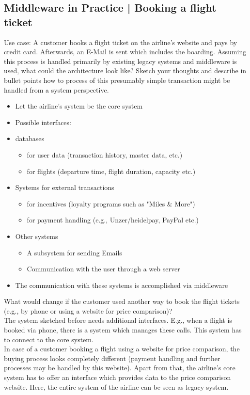 \documentclass{article}
\begin{document}
\subsection{Middleware in Practice | Booking a flight ticket}
Use case: A customer books a flight ticket on the airline's website and pays by credit card. Afterwards, an E-Mail is sent which includes the boarding. Assuming this process is handled primarily by existing legacy systems and middleware is used, what could the architecture look like? Sketch your thoughts and describe in bullet points how to process of this presumably simple transaction might be handled from a system perspective.
\begin{itemize}
    \item Let the airline's system be the core system
    \item Possible interfaces:
    \item databases
          \begin{itemize}
              \item for user data (transaction history, master data, etc.)
              \item for flights (departure time, flight duration, capacity etc.)
          \end{itemize}
    \item Systems for external transactions
          \begin{itemize}
              \item for incentives (loyalty programs such as "Miles \& More")
              \item for payment handling (e.g., Unzer/heidelpay, PayPal etc.)
          \end{itemize}
    \item Other systems
          \begin{itemize}
              \item A subsystem for sending Emails
              \item Communication with the user through a web server
          \end{itemize}
    \item The communication with these systems is accomplished via middleware
\end{itemize}
What would change if the customer used another way to book the flight tickets (e.g., by phone or using a website for price comparison)? \\
The system sketched before needs additional interfaces. E.g., when a flight is booked via phone, there is a system which manages these calls. This system has to connect to the core system.\\
In case of a customer booking a flight using a website for price comparison, the buying process looks completely different (payment handling and further processes may be handled by this website).
Apart from that, the airline's core system has to offer an interface which provides data to the price comparison website. Here, the entire system of the airline can be seen as legacy system.
\end{document}
